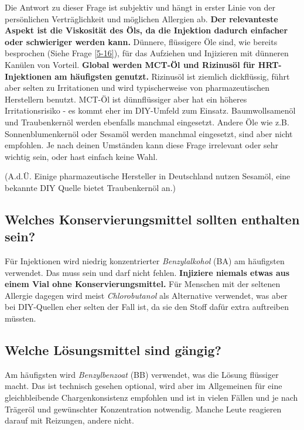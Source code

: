 \documentclass{article}
\begin{document}
Die Antwort zu dieser Frage ist subjektiv und hängt in erster Linie von der persönlichen Verträglichkeit und möglichen Allergien ab. \textbf{Der relevanteste Aspekt ist die Viskosität des Öls, da die Injektion dadurch einfacher oder schwieriger werden kann.} Dünnere, flüssigere Öle sind, wie bereits besprochen (Siehe Frage \ref{5-16}), für das Aufziehen und Injizieren mit dünneren Kanülen von Vorteil. \textbf{Global werden MCT-Öl und Rizinusöl für HRT-Injektionen am häufigsten genutzt. }Rizinusöl ist ziemlich dickflüssig, führt aber selten zu Irritationen und wird typischerweise von pharmazeutischen Herstellern benutzt. MCT-Öl ist dünnflüssiger aber hat ein höheres Irritationsrisiko - es kommt eher im DIY-Umfeld zum Einsatz. Baumwollsamenöl und Traubenkernöl werden ebenfalls manchmal eingesetzt. Andere Öle wie z.B. Sonnenblumenkernöl oder Sesamöl werden manchmal eingesetzt, sind aber nicht empfohlen. Je nach deinen Umständen kann diese Frage irrelevant oder sehr wichtig sein, oder hast einfach keine Wahl.

(A.d.Ü. Einige pharmazeutische Hersteller in Deutschland nutzen Sesamöl, eine bekannte DIY Quelle bietet Traubenkernöl an.)

\subsection{Welches Konservierungsmittel sollten enthalten sein?}\label{6-17}

Für Injektionen wird niedrig konzentrierter \textit{Benzylalkohol} (BA) am häufigsten verwendet. Das muss sein und darf nicht fehlen. \textbf{Injiziere niemals etwas aus einem Vial ohne Konservierungsmittel. }Für Menschen mit der seltenen Allergie dagegen wird meist \textit{Chlorobutanol }als Alternative verwendet, was aber bei DIY-Quellen eher selten der Fall ist, da sie den Stoff dafür extra auftreiben müssten.

\subsection{Welche Lösungsmittel sind gängig?}

Am häufigsten wird \textit{Benzylbenzoat} (BB) verwendet, was die Lösung flüssiger macht. Das ist technisch gesehen optional, wird aber im Allgemeinen für eine gleichbleibende Chargenkonsistenz empfohlen und ist in vielen Fällen und je nach Trägeröl und gewünschter Konzentration notwendig. Manche Leute reagieren darauf mit Reizungen, andere nicht.
\end{document}
